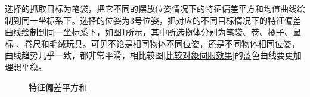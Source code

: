 \documentclass[fontset=fandol,type=bachelor,campus=harbin,bsmainpagenumberline=true]{hithesisbook}
\begin{document}
选择的抓取目标为笔袋，把它不同的摆放位姿情况下的特征偏差平方和均值曲线绘制到同一坐标系下。选择的位姿为3号位姿，把对应的不同目标情况下的特征偏差曲线绘制到同一坐标系下，如图\ref{伺服性能特征偏差平方和}所示，其中所选物体分别为笔袋、卷、橘子、鼠标 、卷尺和毛绒玩具。可见不论是相同物体不同位姿，还是不同物体相同位姿，曲线趋势几乎一致，都非常平滑，相比较图\ref{比较对象伺服效果}的蓝色曲线要更加理想平稳。
\begin{figure}[h]
	\centering
	\caption{特征偏差平方和}
	\label{伺服性能特征偏差平方和}
\end{figure}
\end{document}
